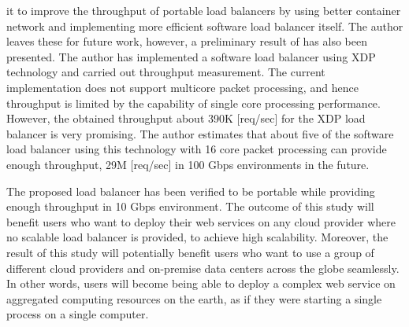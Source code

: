  it  to improve the throughput of portable load balancers by using better container network and implementing more efficient software load balancer itself.
The author leaves these for future work, however, a preliminary result of  has also been presented.
The author has implemented a software load balancer using XDP technology and carried out throughput measurement.
The current implementation does not support multicore packet processing, and hence throughput is limited by the capability of single core processing performance.
However, the obtained throughput about 390K [req/sec] for the XDP load balancer is very promising.
The author estimates that about five of the software load balancer using this technology with 16 core packet processing can provide enough throughput, 29M [req/sec] in 100 Gbps environments in the future. 

The proposed load balancer has been verified to be portable while providing enough throughput in 10 Gbps environment.
The outcome of this study will benefit users who want to deploy their web services on any cloud provider where no scalable load balancer is provided, to achieve high scalability.
Moreover, the result of this study will potentially benefit users who want to use a group of different cloud providers and on-premise data centers across the globe seamlessly.
In other words, users will become being able to deploy a complex web service on aggregated computing resources on the earth, as if they were starting a single process on a single computer.



 
